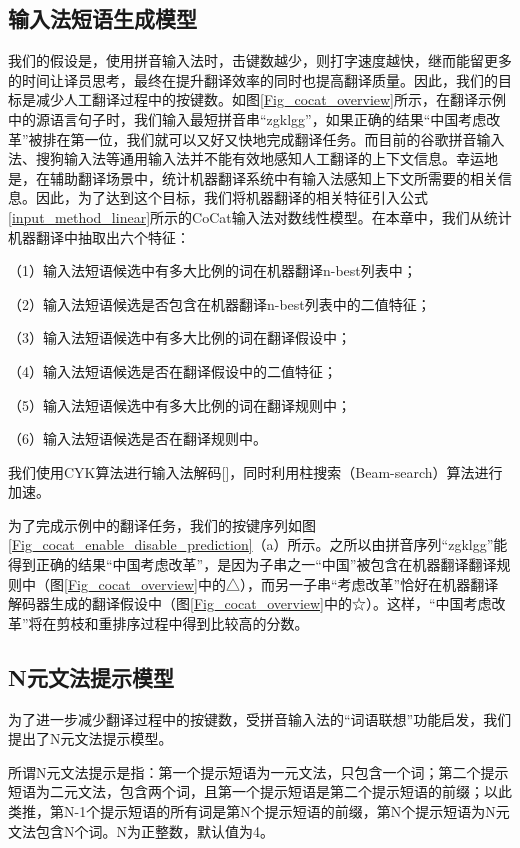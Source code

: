 \subsection{输入法短语生成模型}

我们的假设是，使用拼音输入法时，击键数越少，则打字速度越快，继而能留更多的时间让译员思考，最终在提升翻译效率的同时也提高翻译质量。因此，我们的目标是减少人工翻译过程中的按键数。如图\ref{Fig_cocat_overview}所示，在翻译示例中的源语言句子时，我们输入最短拼音串“zgklgg”，如果正确的结果“中国考虑改革”被排在第一位，我们就可以又好又快地完成翻译任务。而目前的谷歌拼音输入法、搜狗输入法等通用输入法并不能有效地感知人工翻译的上下文信息。幸运地是，在辅助翻译场景中，统计机器翻译系统中有输入法感知上下文所需要的相关信息。因此，为了达到这个目标，我们将机器翻译的相关特征引入公式\ref{input_method_linear}所示的CoCat输入法对数线性模型。在本章中，我们从统计机器翻译中抽取出六个特征：

（1）输入法短语候选中有多大比例的词在机器翻译n-best列表中；

（2）输入法短语候选是否包含在机器翻译n-best列表中的二值特征；

（3）输入法短语候选中有多大比例的词在翻译假设中；

（4）输入法短语候选是否在翻译假设中的二值特征；

（5）输入法短语候选中有多大比例的词在翻译规则中；

（6）输入法短语候选是否在翻译规则中。

我们使用CYK算法进行输入法解码[\cite{Kasami:1965,Younger:1967}]，同时利用柱搜索（Beam-search）算法进行加速。

为了完成示例中的翻译任务，我们的按键序列如图\ref{Fig_cocat_enable_disable_prediction}（a）所示。之所以由拼音序列“zgklgg”能得到正确的结果“中国考虑改革”，是因为子串之一“中国”被包含在机器翻译翻译规则中（图\ref{Fig_cocat_overview}中的△），而另一子串“考虑改革”恰好在机器翻译解码器生成的翻译假设中（图\ref{Fig_cocat_overview}中的☆）。这样，“中国考虑改革”将在剪枝和重排序过程中得到比较高的分数。

\subsection{N元文法提示模型}

为了进一步减少翻译过程中的按键数，受拼音输入法的“词语联想”功能启发，我们提出了N元文法提示模型。

所谓N元文法提示是指：第一个提示短语为一元文法，只包含一个词；第二个提示短语为二元文法，包含两个词，且第一个提示短语是第二个提示短语的前缀；以此类推，第N-1个提示短语的所有词是第N个提示短语的前缀，第N个提示短语为N元文法包含N个词。N为正整数，默认值为4。

